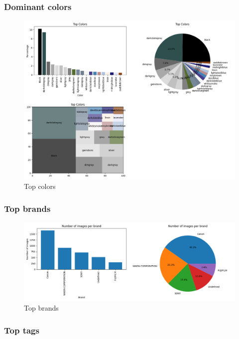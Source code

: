 \documentclass{article}
\begin{document}
    \newpage

    \subsubsection{Dominant colors}\label{subsubsec:dominant_colors}

    \begin{figure}[htbp]
        \centering
        \includegraphics[width=0.9 \textwidth]{img/dominant_color}
        \caption{Top colors}
        \label{fig:dominant_colors}

    \end{figure}

    \subsubsection{Top brands}\label{subsubsec:top_brands}

    \begin{figure}[htbp]
        \centering
        \includegraphics[width=0.8 \textwidth]{img/brand}
        \caption{Top brands}
        \label{fig:top_brands}
    \end{figure}

    \newpage

    \subsubsection{Top tags}\label{subsubsec:top_tags}
\end{document}
